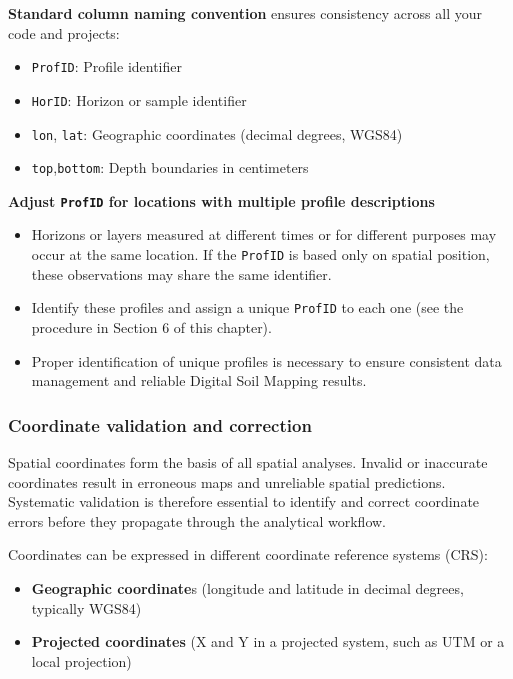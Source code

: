 \documentclass[
  10pt,
  b5paper,
  oneside]{book}
\providecommand{\tightlist}{%
  \setlength{\itemsep}{0pt}\setlength{\parskip}{0pt}}
\begin{document}
\textbf{Standard column naming convention} ensures consistency across all your code and projects:

\begin{itemize}
\item
  \texttt{ProfID}: Profile identifier
\item
  \texttt{HorID}: Horizon or sample identifier
\item
  \texttt{lon}, \texttt{lat}: Geographic coordinates (decimal degrees, WGS84)
\item
  \texttt{top},\texttt{bottom}: Depth boundaries in centimeters
\end{itemize}

\textbf{Adjust \texttt{ProfID} for locations with multiple profile descriptions}

\begin{itemize}
\item
  Horizons or layers measured at different times or for different purposes may occur at the same location. If the \texttt{ProfID} is based only on spatial position, these observations may share the same identifier.
\item
  Identify these profiles and assign a unique \texttt{ProfID} to each one (see the procedure in Section 6 of this chapter).
\item
  Proper identification of unique profiles is necessary to ensure consistent data management and reliable Digital Soil Mapping results.
\end{itemize}

\subsubsection{Coordinate validation and correction}\label{coordinate-validation-and-correction}

Spatial coordinates form the basis of all spatial analyses. Invalid or inaccurate coordinates result in erroneous maps and unreliable spatial predictions. Systematic validation is therefore essential to identify and correct coordinate errors before they propagate through the analytical workflow.

Coordinates can be expressed in different coordinate reference systems (CRS):

\begin{itemize}
\tightlist
\item
  \textbf{Geographic coordinate}s (longitude and latitude in decimal degrees, typically WGS84)
\item
  \textbf{Projected coordinates} (X and Y in a projected system, such as UTM or a local projection)
\end{itemize}
\end{document}
